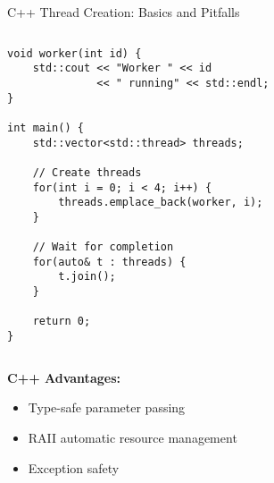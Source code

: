 \begin{frame}[fragile]{ C++ Thread Creation: Basics and Pitfalls}
\begin{columns}
\begin{column}{0.5\textwidth}
\begin{verbatim}
void worker(int id) {
    std::cout << "Worker " << id
              << " running" << std::endl;
}

int main() {
    std::vector<std::thread> threads;

    // Create threads
    for(int i = 0; i < 4; i++) {
        threads.emplace_back(worker, i);
    }

    // Wait for completion
    for(auto& t : threads) {
        t.join();
    }

    return 0;
}
			\end{verbatim}
	\end{column}
	\end{columns}

	\vspace{0.5em}
	\textbf{C++ Advantages:}
	\begin{itemize}
		\item Type-safe parameter passing
		\item RAII automatic resource management
		\item Exception safety
	\end{itemize}
\end{frame}

